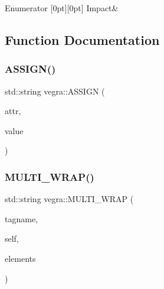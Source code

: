 \begin{DoxyEnumFields}{Enumerator}
[0pt][0pt]{}\mbox{\label{namespacevegra_a342c4e8c946c4f729d694257d1ed876ba21f59b54f62b5b8b4bc0f63f0f617fc1}} 
Impact&\\
\hline

\end{DoxyEnumFields}


\subsection{Function Documentation}
\mbox{\label{namespacevegra_a4893502d3540c9e206e49072ffaa4316}} 
\subsubsection{\texorpdfstring{A\+S\+S\+I\+G\+N()}{ASSIGN()}}
{\footnotesize\ttfamily std\+::string vegra\+::\+A\+S\+S\+I\+GN (\begin{DoxyParamCaption}\item[{std\+::string}]{attr,  }\item[{std\+::string}]{value }\end{DoxyParamCaption})\hspace{0.3cm}{\ttfamily [inline]}}

\mbox{\label{namespacevegra_a46b18aa974bf220f63e7d00163eb549a}} 
\subsubsection{\texorpdfstring{M\+U\+L\+T\+I\+\_\+\+W\+R\+A\+P()}{MULTI\_WRAP()}}
{\footnotesize\ttfamily std\+::string vegra\+::\+M\+U\+L\+T\+I\+\_\+\+W\+R\+AP (\begin{DoxyParamCaption}\item[{std\+::string}]{tagname,  }\item[{std\+::string}]{self,  }\item[{\mbox{\hyperlink{namespacevegra_a2722f5eceb74f65746a02a57b71d125e}{S\+V\+G\+Element\+List}}}]{elements }\end{DoxyParamCaption})\hspace{0.3cm}{\ttfamily [inline]}}



